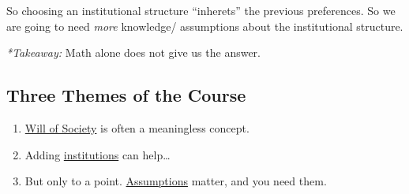 \documentclass{article}
\begin{document}
So choosing an institutional structure ``inherets'' the previous preferences. So we are going to need \emph{more} knowledge/ assumptions about the institutional structure.

\emph{*Takeaway:} Math alone does not give us the answer.

\subsection*{Three Themes of the Course}
\begin{enumerate}

\item \underline{Will of Society} is often a meaningless concept.
\item Adding \underline{institutions} can help\dots
\item But only to a point. \underline{Assumptions} matter, and you need them.
\end{enumerate}%
\end{document}

